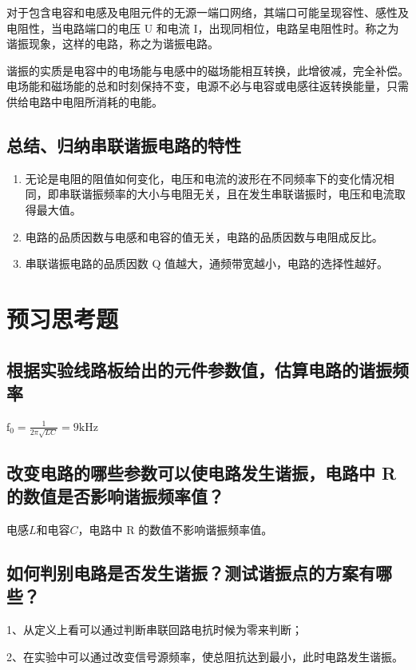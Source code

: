 \documentclass{article}
\begin{document}
对于包含电容和电感及电阻元件的无源一端口网络，其端口可能呈现容性、感性及电阻性，当电路端口的电压 U 和电流 I，出现同相位，电路呈电阻性时。称之为谐振现象，这样的电路，称之为谐振电路。 

谐振的实质是电容中的电场能与电感中的磁场能相互转换，此增彼减，完全补偿。电场能和磁场能的总和时刻保持不变，电源不必与电容或电感往返转换能量，只需供给电路中电阻所消耗的电能。

\subsection{总结、归纳串联谐振电路的特性}

\begin{enumerate}
        \item 无论是电阻的阻值如何变化，电压和电流的波形在不同频率下的变化情况相同，即串联谐振频率的大小与电阻无关，且在发生串联谐振时，电压和电流取得最大值。
        \item 电路的品质因数与电感和电容的值无关，电路的品质因数与电阻成反比。
        \item 串联谐振电路的品质因数 Q 值越大，通频带宽越小，电路的选择性越好。
    \end{enumerate} 



\section{预习思考题 }
\subsection{根据实验线路板给出的元件参数值，估算电路的谐振频率 }

$\mathrm{f}_0=\frac{1}{2 \pi \sqrt{L C}}=     9 \mathrm{k}  \mathrm{Hz}      $

\subsection{改变电路的哪些参数可以使电路发生谐振，电路中 R 的数值是否影响谐振频率值？}
电感$L$和电容$C$，电路中 R 的数值不影响谐振频率值。

\subsection{如何判别电路是否发生谐振？测试谐振点的方案有哪些？}

1、从定义上看可以通过判断串联回路电抗时候为零来判断；

2、在实验中可以通过改变信号源频率，使总阻抗达到最小，此时电路发生谐振。
\end{document}
